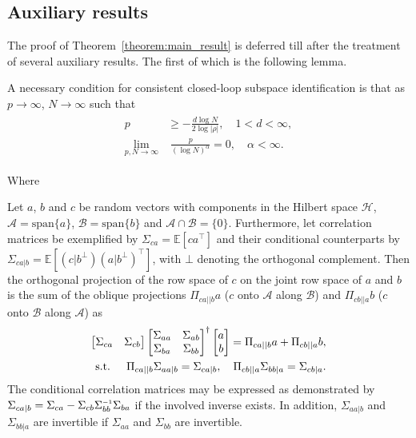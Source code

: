 \subsection{Auxiliary results}
The proof of Theorem~\ref{theorem:main_result} is deferred till after the treatment of several auxiliary results. The first of which is the following lemma.
\setcounter{thm}{0}
\begin{lem}\label{lem:relative_rates}\citep{Bauer2002,Chiuso2006}
    A necessary condition for consistent closed-loop subspace identification is that as $p\rightarrow\infty$, $N\rightarrow\infty$ such that
    \begin{align}\label{eq:relative_rates}
        \begin{split}
            p &\geq -\frac{d\log N}{2\log|\rho|}, \quad 1 < d < \infty,\\
            \lim_{p,N\rightarrow\infty} &\; \frac{p}{(\log N)^\alpha}=0, \quad \alpha < \infty.
        \end{split}
    \end{align}
\end{lem}
Where 

\begin{lem}\label{lem:oblique_projections}\citep[Lemma~1]{VanOverschee1994,Katayama1999} Let $a$, $b$ and $c$ be random vectors with components in the Hilbert space $\mathscr{H}$, $\mathscr{A}=\text{span}\{a\}$, $\mathscr{B}=\text{span}\{b\}$ and $\mathscr{A}\cap\mathscr{B}=\{0\}$. Furthermore, let correlation matrices be exemplified by $\Sigma_{ca}=\mathbb{E}[ca^\top]$ and their conditional counterparts by $\Sigma_{ca|b}=\mathbb{E}[(c|b^\bot)(a|b^\bot)^\top]$, with $\bot$ denoting the orthogonal complement. Then the orthogonal projection of the row space of $c$ on the joint row space of $a$ and $b$ is the sum of the oblique projections $\Pi_{ca||b}a$ ($c$ onto $\mathscr{A}$ along $\mathscr{B}$) and $\Pi_{cb||a}b$ ($c$ onto $\mathscr{B}$ along $\mathscr{A}$) as
\begin{align}
    \begin{bmatrix}
        \Sigma_{ca} & \Sigma_{cb}
    \end{bmatrix}
    \begin{bmatrix}
        \Sigma_{aa} & \Sigma_{ab}\\ \Sigma_{ba} & \Sigma_{bb}
    \end{bmatrix}^\dagger
    \begin{bmatrix}
        a \\ b
    \end{bmatrix} = \Pi_{ca||b} a + \Pi_{cb||a} b,\label{eq:oblique_project}\\
    \text{s.t. }\quad\Pi_{ca||b}\Sigma_{aa|b} = \Sigma_{ca|b},\quad \Pi_{cb||a}\Sigma_{bb|a} = \Sigma_{cb|a}.\notag
\end{align}
The conditional correlation matrices may be expressed as demonstrated by $\Sigma_{ca|b}=\Sigma_{ca}-\Sigma_{cb}\Sigma_{bb}\inv\Sigma_{ba}$ if the involved inverse exists. In addition, $\Sigma_{aa|b}$ and $\Sigma_{bb|a}$ are invertible if $\Sigma_{aa}$ and $\Sigma_{bb}$ are invertible.
\end{lem}
